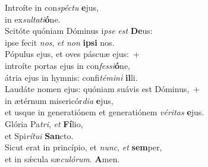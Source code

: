 \evenverse Introíte in con\textit{spé}\textit{ctu} \textbf{e}jus,~\*\\
\evenverse in ex\textit{sul}\textit{ta}\textit{ti}\textbf{ó}ne.\\
\oddverse Scitóte quóniam Dóminus i\textit{pse} \textit{est} \textbf{De}us:~\*\\
\oddverse ipse fecit \textit{nos}, \textit{et} \textit{non} \textbf{i}\textbf{psi} nos.\\
\evenverse Pópulus ejus, et oves páscuæ ejus:~+\\
\evenverse  introíte portas ejus in con\textit{fes}\textit{si}\textbf{ó}ne,~\*\\
\evenverse átria ejus in hymnis: confi\textit{té}\textit{mi}\textit{ni} \textbf{il}li.\\
\oddverse Laudáte nomen ejus: quóniam suávis est Dóminus,~+\\
\oddverse  in ætérnum misericór\textit{di}\textit{a} \textbf{e}jus,~\*\\
\oddverse et usque in generatiónem et generatiónem \textit{vé}\textit{ri}\textit{tas} \textbf{e}jus.\\
\evenverse Glória Pa\textit{tri}, \textit{et} \textbf{Fí}lio,~\*\\
\evenverse et Spi\textit{rí}\textit{tu}\textit{i} \textbf{San}cto.\\
\oddverse Sicut erat in princípio, et \textit{nunc}, \textit{et} \textbf{sem}per,~\*\\
\oddverse et in sǽcula sæ\textit{cu}\textit{ló}\textit{rum}. \textbf{A}men.\\
